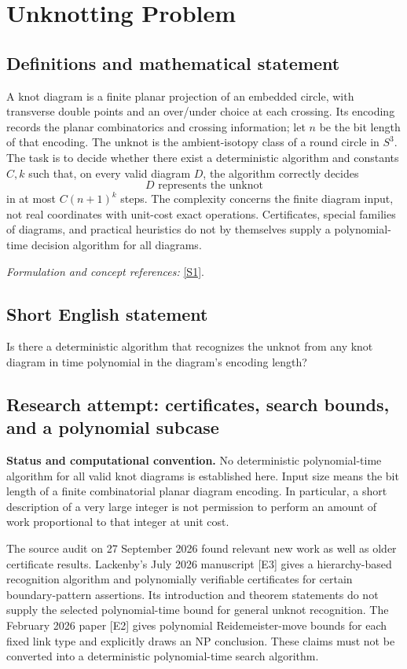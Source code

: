 \documentclass[11pt]{article}
\begin{document}
\section*{\texorpdfstring{Unknotting Problem}{Unknotting Problem}}\label{1331}
\subsection{Definitions and mathematical statement}
A knot diagram is a finite planar projection of an embedded circle, with transverse double points and an over/under choice at each crossing. Its encoding records the planar combinatorics and crossing information; let $n$ be the bit length of that encoding. The unknot is the ambient-isotopy class of a round circle in $S^3$. The task is to decide whether there exist a deterministic algorithm and constants $C,k$ such that, on every valid diagram $D$, the algorithm correctly decides
\[
 D\text{ represents the unknot}
\]
in at most $C(n+1)^k$ steps. The complexity concerns the finite diagram input, not real coordinates with unit-cost exact operations. Certificates, special families of diagrams, and practical heuristics do not by themselves supply a polynomial-time decision algorithm for all diagrams.
\par\smallskip\textit{Formulation and concept references:} \href{https://arxiv.org/abs/1211.1079}{[S1]}.

\subsection{Short English statement}
Is there a deterministic algorithm that recognizes the unknot from any knot diagram in time polynomial in the diagram's encoding length?
\subsection{Research attempt: certificates, search bounds, and a polynomial subcase}
\textbf{Status and computational convention.} No deterministic polynomial-time algorithm for all valid knot diagrams is established here. Input size means the bit length of a finite combinatorial planar diagram encoding. In particular, a short description of a very large integer is not permission to perform an amount of work proportional to that integer at unit cost.

The source audit on 27 September 2026 found relevant new work as well as older certificate results. Lackenby's July 2026 manuscript [E3] gives a hierarchy-based recognition algorithm and polynomially verifiable certificates for certain boundary-pattern assertions. Its introduction and theorem statements do not supply the selected polynomial-time bound for general unknot recognition. The February 2026 paper [E2] gives polynomial Reidemeister-move bounds for each fixed link type and explicitly draws an NP conclusion. These claims must not be converted into a deterministic polynomial-time search algorithm.
\end{document}
